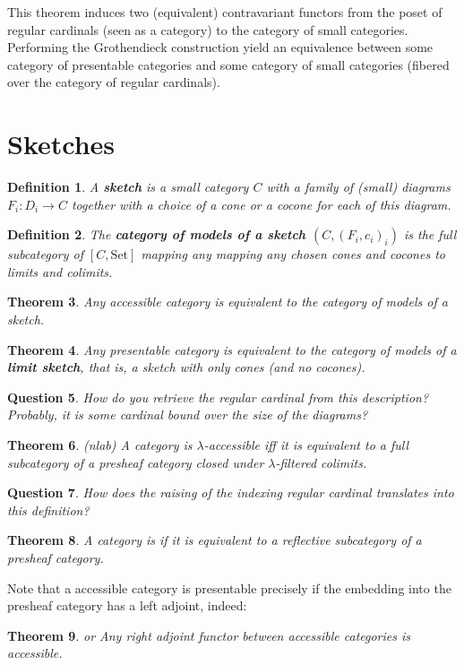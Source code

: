 \documentclass{article}
\newcommand{\Set}{\text{Set}}
\newtheorem{theorem}{Theorem}[section]
\newtheorem{definition}[theorem]{Definition}
\newtheorem{question}[theorem]{Question}
\begin{document}
This theorem induces two (equivalent) contravariant functors
from the poset of regular cardinals (seen
as a category) to the category of small categories. Performing the Grothendieck construction yield
an equivalence between some category of presentable categories and some category
of small categories (fibered over the
category of regular cardinals).
\section{Sketches}
\begin{definition}
 A \textbf{sketch} is a small category $C$ with a family of (small) diagrams $F_i : D_i
 \to C$ together with a choice of a cone or a cocone for each of this diagram.
\end{definition}
\begin{definition}
  The \textbf{category of models of a sketch $(C,(F_i,c_i)_i)$} is the full
  subcategory of $[C,\Set]$ mapping any mapping any chosen cones and cocones to
  limits and colimits.
\end{definition}
\begin{theorem}
 Any accessible category is equivalent to the category of models of a sketch.
\end{theorem}
\begin{theorem}
 Any presentable category is equivalent to the category of models of a
 \textbf{limit sketch}, that is, a sketch with only cones (and no cocones).
\end{theorem}
\begin{question}
 How do you retrieve the regular cardinal from this description? Probably, it is
some cardinal bound over the size of the diagrams?
\end{question}
\begin{theorem}
  (nlab)
 A  category is $\lambda$-accessible iff it is equivalent to a full subcategory
 of a presheaf category closed under $\lambda$-filtered colimits.
\end{theorem}
\begin{question}
  How does the raising of the indexing regular cardinal translates into this definition?
\end{question}
\begin{theorem}
 A category is if it is equivalent to a reflective subcategory
 of a presheaf category.
\end{theorem}
Note that a accessible category is presentable
precisely if the embedding into the presheaf category has a left adjoint, indeed:
\begin{theorem}\cite[Proposition 2.4.8]{accessible} or \cite[2.23]{adamek_rosicky}
  Any right adjoint functor between accessible categories is accessible.
\end{theorem}
\end{document}
